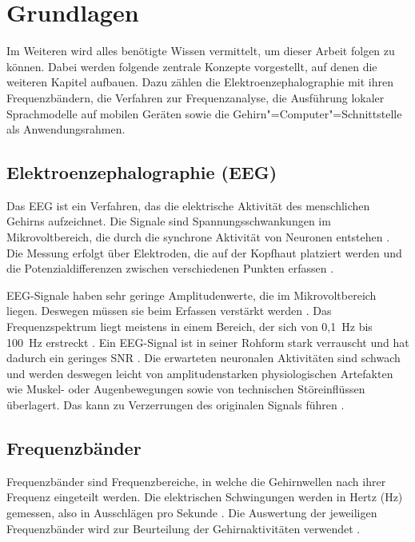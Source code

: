 \chapter{Grundlagen}
\label{ch:grundlagen}
Im Weiteren wird alles benötigte Wissen vermittelt, um dieser Arbeit folgen zu können. Dabei werden folgende zentrale Konzepte vorgestellt, auf denen die weiteren Kapitel aufbauen. Dazu zählen die Elektroenzephalographie mit ihren Frequenzbändern, die Verfahren zur Frequenzanalyse, die Ausführung lokaler Sprachmodelle auf mobilen Geräten sowie die Gehirn"=Computer"=Schnittstelle als Anwendungsrahmen.

\section{Elektroenzephalographie (EEG)}
\label{sec:eeg}

Das \ac{EEG} ist ein Verfahren, das die elektrische Aktivität des menschlichen Gehirns aufzeichnet. Die Signale sind Spannungsschwankungen im Mikrovoltbereich, die durch die synchrone Aktivität von Neuronen entstehen \autocite{blum2017}. Die Messung erfolgt über Elektroden, die auf der Kopfhaut platziert werden und die Potenzialdifferenzen zwischen verschiedenen Punkten erfassen \autocite{10353995}.
\vspace{\baselineskip}

\noindent \ac{EEG}-Signale haben sehr geringe Amplitudenwerte, die im Mikrovoltbereich liegen. Deswegen müssen sie beim Erfassen verstärkt werden \autocite{blum2017,10353995}.
Das Frequenzspektrum liegt meistens in einem Bereich, der sich von 0,1~Hz bis 100~Hz erstreckt \autocite{10353995}.
Ein \ac{EEG}-Signal ist in seiner Rohform stark verrauscht und hat dadurch ein geringes \ac{SNR} \autocite{blum2017}.
Die erwarteten neuronalen Aktivitäten sind schwach und werden deswegen leicht von amplitudenstarken physiologischen Artefakten wie Muskel- oder Augenbewegungen sowie von technischen Störeinflüssen überlagert. Das kann zu Verzerrungen des originalen Signals führen \autocite{10353995}.

\section{Frequenzbänder}
\label{sec:baender}
Frequenzbänder sind Frequenzbereiche, in welche die Gehirnwellen nach ihrer Frequenz eingeteilt werden. Die elektrischen Schwingungen werden in Hertz (Hz) gemessen, also in Ausschlägen pro Sekunde \autocite{10353995}.
Die Auswertung der jeweiligen Frequenzbänder wird zur Beurteilung der Gehirnaktivitäten verwendet \autocite{10353995}.

